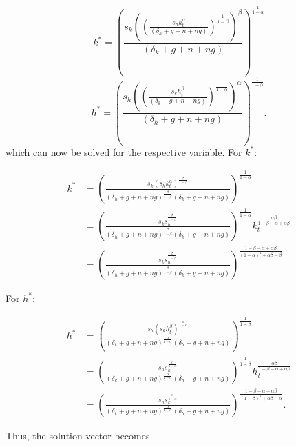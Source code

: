 \documentclass{article}
\begin{document}
\begin{equation}
 k^*= \left(\frac{s_k \left(\left(\frac{s_h k_t^\alpha}{\left(\delta_h +g+n+ng\right)}\right)^{\frac{1}{1-\beta}}\right)^\beta}{\left(\delta_k +g+n+ng\right)}\right)^{\frac{1}{1-\alpha}} 
\end{equation}
\begin{equation}
 h^*= \left(\frac{s_h \left(\left(\frac{s_k h_t^\beta}{\left(\delta_k +g+n+ng\right)}\right)^{\frac{1}{1-\alpha}}\right)^\alpha}{\left(\delta_h +g+n+ng\right)}\right)^{\frac{1}{1-\beta}}.
\end{equation}
which can now be solved for the respective variable. For $k^*$:
\begin{center}
\begin{align*}
 k^*&= \left(\frac{s_k \left(s_h k_t^\alpha \right)^{\frac{ \beta}{1-\beta}}}{\left(\delta_h +g+n+ng\right)^{\frac{\beta}{1-\beta}}\left(\delta_k +g+n+ng\right)}\right)^{\frac{1}{1-\alpha}} \\
 &= \left(\frac{s_k s_h^{\frac{ \beta}{1-\beta}}}{\left(\delta_h +g+n+ng\right)^{\frac{\beta}{1-\beta}}\left(\delta_k +g+n+ng\right)}\right)^{\frac{1}{1-\alpha}} k_t^{\frac{\alpha \beta}{1-\beta - \alpha + \alpha \beta}} \\
  &= \left(\frac{s_k s_h^{\frac{ \beta}{1-\beta}}}{\left(\delta_h +g+n+ng\right)^{\frac{\beta}{1-\beta}}\left(\delta_k +g+n+ng\right)}\right)^{\frac{1-\beta- \alpha + \alpha \beta}{\left(1-\alpha\right)^2 +\alpha \beta -\beta}} 
  \end{align*}
\end{center}
For $h^*$:
\begin{center}
\begin{align*}
 h^*&= \left(\frac{s_h \left(s_k h_t^\beta\right)^{\frac{\alpha}{1-\alpha}}}{\left(\delta_k +g+n+ng\right)^{\frac{\alpha}{1-\alpha}}\left(\delta_h +g+n+ng\right)}\right)^{\frac{1}{1-\beta}} \\
 &= \left(\frac{s_h s_k^{\frac{\alpha}{1-\alpha}}}{\left(\delta_k +g+n+ng\right)^{\frac{\alpha}{1-\alpha}}\left(\delta_h +g+n+ng\right)}\right)^{\frac{1}{1-\beta}} h_t^{\frac{ \alpha \beta}{1-\beta-\alpha +\alpha \beta}}\\
 &= \left(\frac{s_h s_k^{\frac{\alpha}{1-\alpha}}}{\left(\delta_k +g+n+ng\right)^{\frac{\alpha}{1-\alpha}}\left(\delta_h +g+n+ng\right)}\right)^{\frac{1-\beta- \alpha + \alpha \beta}{\left(1-\beta \right)^2 +\alpha \beta -\alpha}}.
\end{align*}
\end{center}
Thus, the solution vector becomes
\end{document}
